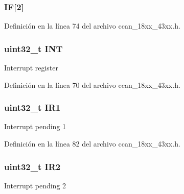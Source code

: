 \subsubsection[{\texorpdfstring{IF}{IF}}]{ IF\mbox{[}2\mbox{]}}\hypertarget{struct_l_p_c___c_c_a_n___t_a7f52b4575273dc848bc3577ad438fef3}{}\label{struct_l_p_c___c_c_a_n___t_a7f52b4575273dc848bc3577ad438fef3}


Definición en la línea 74 del archivo ccan\+\_\+18xx\+\_\+43xx.\+h.

\subsubsection[{\texorpdfstring{I\+NT}{INT}}]{ uint32\+\_\+t I\+NT}\hypertarget{struct_l_p_c___c_c_a_n___t_a6029b46f9633a968124bfbd9e67992ca}{}\label{struct_l_p_c___c_c_a_n___t_a6029b46f9633a968124bfbd9e67992ca}
Interrupt register 

Definición en la línea 70 del archivo ccan\+\_\+18xx\+\_\+43xx.\+h.

\subsubsection[{\texorpdfstring{I\+R1}{IR1}}]{ uint32\+\_\+t I\+R1}\hypertarget{struct_l_p_c___c_c_a_n___t_a5c28010084f84d7fe78919318b756102}{}\label{struct_l_p_c___c_c_a_n___t_a5c28010084f84d7fe78919318b756102}
Interrupt pending 1 

Definición en la línea 82 del archivo ccan\+\_\+18xx\+\_\+43xx.\+h.

\subsubsection[{\texorpdfstring{I\+R2}{IR2}}]{ uint32\+\_\+t I\+R2}\hypertarget{struct_l_p_c___c_c_a_n___t_a88cf12ce48ba72c3ee5c5922d21a8b0f}{}\label{struct_l_p_c___c_c_a_n___t_a88cf12ce48ba72c3ee5c5922d21a8b0f}
Interrupt pending 2 

